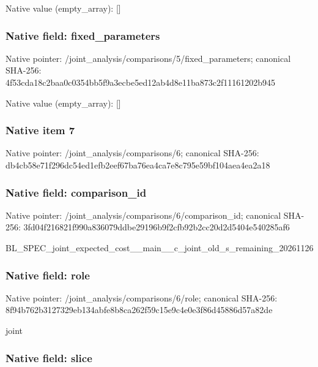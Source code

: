 \documentclass[10pt,a4paper]{article}
\begin{document}
Native value (empty\_array): []



\subsubsection{Native field: fixed\_parameters}


Native pointer: /joint\_analysis/comparis\allowbreak{}ons/5/fixed\_parameters; canonical SHA-256: 4f53cda18c2baa0c0354bb5f\allowbreak{}9a3ecbe5ed12ab4d8e11ba87\allowbreak{}3c2f11161202b945



Native value (empty\_array): []



\subsubsection{Native item 7}


Native pointer: /joint\_analysis/comparisons/6; canonical SHA-256: db4cb58e71f296dc54ed1efb\allowbreak{}2eef67ba76ea4ca7e8c795e5\allowbreak{}9bf104aea4ea2a18



\subsubsection{Native field: comparison\_id}


Native pointer: /joint\_analysis/comparis\allowbreak{}ons/6/comparison\_id; canonical SHA-256: 3fd04f216821f990a836079d\allowbreak{}dbe29196b9f2cfb92b2cc20d\allowbreak{}2d5404e540285af6


BL\_SPEC\_joint\_expected\_c\allowbreak{}ost\_\_main\_\_c\_joint\_old\_s\allowbreak{}\_remaining\_20261126


\subsubsection{Native field: role}


Native pointer: /joint\_analysis/comparisons/6/role; canonical SHA-256: 8f94b762b3127329eb134abf\allowbreak{}e8b8ca262f59c15e9c4e0e3f\allowbreak{}86d45886d57a82de


joint


\subsubsection{Native field: slice}
\end{document}
